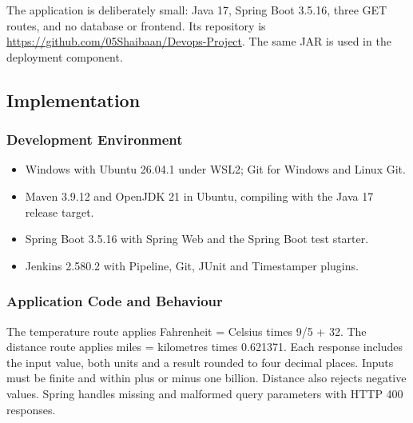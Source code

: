 \documentclass[12pt,a4paper]{article}
\begin{document}
The application is deliberately small: Java 17, Spring Boot 3.5.16, three GET routes, and no database or frontend. Its repository is \url{https://github.com/05Shaibaan/Devops-Project}. The same JAR is used in the deployment component.

\subsection*{Implementation}
\subsubsection*{Development Environment}
\begin{itemize}[nosep]
\item Windows with Ubuntu 26.04.1 under WSL2; Git for Windows and Linux Git.
\item Maven 3.9.12 and OpenJDK 21 in Ubuntu, compiling with the Java 17 release target.
\item Spring Boot 3.5.16 with Spring Web and the Spring Boot test starter.
\item Jenkins 2.580.2 with Pipeline, Git, JUnit and Timestamper plugins.
\end{itemize}

\subsubsection*{Application Code and Behaviour}
The temperature route applies Fahrenheit = Celsius times 9/5 + 32. The distance route applies miles = kilometres times 0.621371. Each response includes the input value, both units and a result rounded to four decimal places. Inputs must be finite and within plus or minus one billion. Distance also rejects negative values. Spring handles missing and malformed query parameters with HTTP 400 responses.

\par\medskip{}\noindent\textbf{}\par\smallskip
\end{document}
